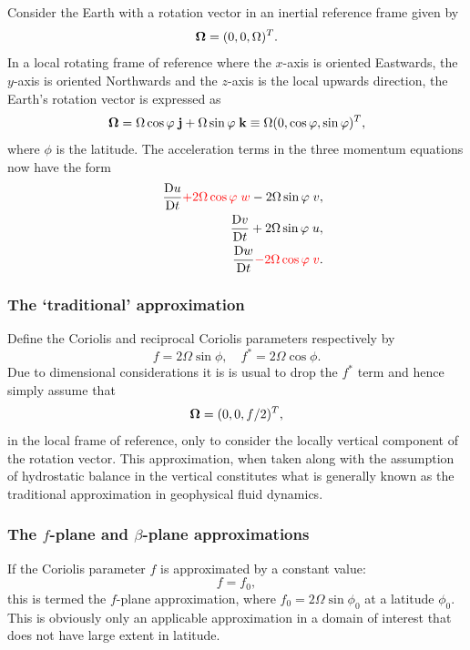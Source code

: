 Consider the Earth with a rotation vector in an inertial reference frame given by 
\begin{equation}\label{eq:on_sphere_rotation}
{\mbox{\boldmath$\Omega$}}=(0,0,\Omega)^T.
\end{equation}
In a local rotating frame of reference where the
$x$-axis is oriented Eastwards,
the $y$-axis is oriented Northwards and the $z$-axis is the local upwards direction,
the Earth's rotation vector is expressed as
\begin{equation*}
{\mbox{\boldmath$\Omega$}} = \Omega \cos \varphi\; {\bf j} + \Omega \sin \varphi\; {\bf k} \equiv \Omega (0,\cos\varphi,\sin\varphi)^T,
\end{equation*}
where $\phi$ is the latitude.
The acceleration terms in the three momentum equations now have the form
{\setlength\arraycolsep{2pt}
\begin{eqnarray*}
&&\frac{\mathrm{D} u}{\mathrm{D} t} {\color{red}+} {\color{red}2\Omega\cos\varphi\; w} - 2\Omega\sin\varphi\; v,\\
&&\frac{\mathrm{D} v}{\mathrm{D} t} + 2\Omega\sin\varphi\; u,\\
&&\frac{\mathrm{D} w}{\mathrm{D} t} {\color{red}-} {\color{red}2\Omega\cos\varphi\; v}.
\end{eqnarray*}}

\subsubsection{The `traditional' approximation}
Define the Coriolis and reciprocal Coriolis parameters \citep{cushman1994} respectively by
\begin{equation}\label{eq:coriolis_parameters} 
f=2\Omega\sin\phi,\quad f^*=2\Omega\cos\phi.
\end{equation}
Due to dimensional considerations it is is usual to
drop the $f^*$ term and hence simply assume that 
\begin{equation}\label{eq:f_omega}
{\mbox{\boldmath$\Omega$}}=(0,0,f/2)^T,
\end{equation}
in the local frame of reference, \ie only to consider the locally vertical
component of the rotation vector.
This approximation, when taken along with the assumption of hydrostatic balance in the
vertical constitutes what is generally known as the traditional approximation in geophysical fluid
dynamics.


\subsubsection{The $f$-plane and $\beta$-plane approximations}
If the Coriolis parameter $f$ is approximated by a constant value:
\begin{equation}\label{eq:f-plane}
f=f_0,
\end{equation}
this is termed the $f$-plane approximation, 
where $f_0 = 2\Omega\sin\phi_0$ at a latitude $\phi_0$.
This is obviously only an applicable approximation in a domain of interest 
that does not have large extent in latitude. 

